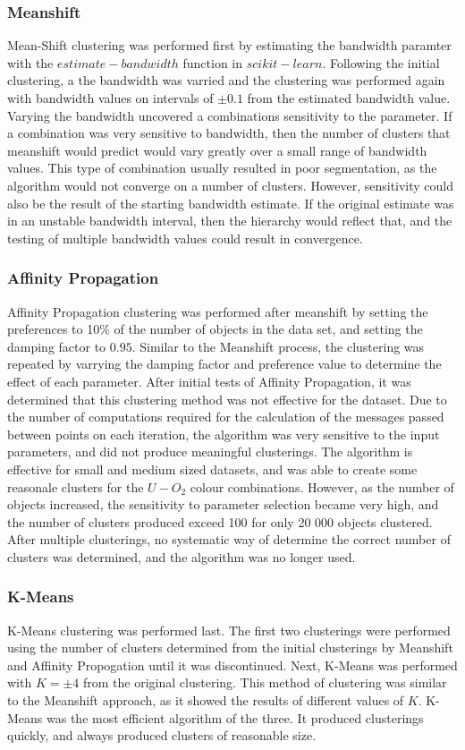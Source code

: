 \subsubsection{Meanshift}
Mean-Shift clustering was performed first by estimating the bandwidth paramter with the $estimate-bandwidth$ function in $scikit-learn$.
Following the initial clustering, a the bandwidth was varried and the clustering was performed again with bandwidth values on intervals of $\pm 0.1$ from the estimated bandwidth value.
Varying the bandwidth uncovered a combinations sensitivity to the parameter.
If a combination was very sensitive to bandwidth, then the number of clusters that meanshift would predict would vary greatly over a small range of bandwidth values.
This type of combination usually resulted in poor segmentation, as the algorithm would not converge on a number of clusters. 
However, sensitivity could also be the result of the starting bandwidth estimate.
If the original estimate was in an unstable bandwidth interval, then the hierarchy would reflect that, and the testing of multiple bandwidth values could result in convergence.

\subsubsection{Affinity Propagation}
Affinity Propagation clustering was performed after meanshift by setting the preferences to 10\% of the number of objects in the data set, and setting the damping factor to $0.95$.
Similar to the Meanshift process, the clustering was repeated by varrying the damping factor and preference value to determine the effect of each parameter.
After initial tests of Affinity Propagation, it was determined that this clustering method was not effective for the dataset.
Due to the number of computations required for the calculation of the messages passed between points on each iteration, the algorithm was very sensitive to the input parameters, and did not produce meaningful clusterings.
The algorithm is effective for small and medium sized datasets, and was able to create some reasonale clusters for the $U - O_{2}$ colour combinations.
However, as the number of objects increased, the sensitivity to parameter selection became very high, and the number of clusters produced exceed 100 for only 20 000 objects clustered.
After multiple clusterings, no systematic way of determine the correct number of clusters was determined, and the algorithm was no longer used.

\subsubsection{K-Means}
K-Means clustering was performed last.
The first two clusterings were performed using the number of clusters determined from the initial clusterings by Meanshift and Affinity Propogation until it was discontinued.
Next, K-Means was performed with $K = \pm 4$ from the original clustering.
This method of clustering was similar to the Meanshift approach, as it showed the results of different values of $K$.
K-Means was the most efficient algorithm of the three. It produced clusterings quickly, and always produced clusters of reasonable size.

